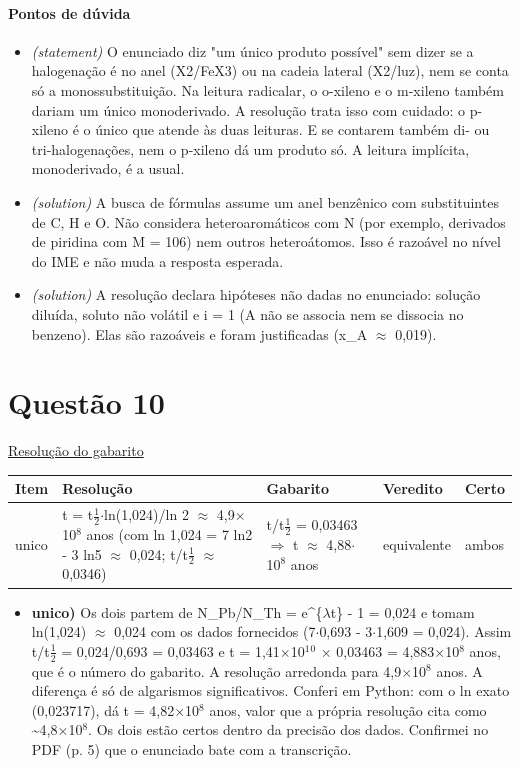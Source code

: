 \documentclass{article}%
\begin{document}
\paragraph{Pontos de dúvida}%
\begin{itemize}%
\item%
\textit{(statement)} O enunciado diz "um único produto possível" sem dizer se a halogenação é no anel (X2/FeX3) ou na cadeia lateral (X2/luz), nem se conta só a monossubstituição. Na leitura radicalar, o o{-}xileno e o m{-}xileno também dariam um único monoderivado. A resolução trata isso com cuidado: o p{-}xileno é o único que atende às duas leituras. E se contarem também di{-} ou tri{-}halogenações, nem o p{-}xileno dá um produto só. A leitura implícita, monoderivado, é a usual.%
\item%
\textit{(solution)} A busca de fórmulas assume um anel benzênico com substituintes de C, H e O. Não considera heteroaromáticos com N (por exemplo, derivados de piridina com M = 106) nem outros heteroátomos. Isso é razoável no nível do IME e não muda a resposta esperada.%
\item%
\textit{(solution)} A resolução declara hipóteses não dadas no enunciado: solução diluída, soluto não volátil e i = 1 (A não se associa nem se dissocia no benzeno). Elas são razoáveis e foram justificadas (x\_A $\approx$ 0,019).%
\end{itemize}%
\section*{Questão 10}%
\href{https://poliedroresolve.sistemapoliedro.com.br/vestibulares/ime/2027/ime-2-fase-dia-3-28-10-2026-2-fase-dia-3/dissertativa-10-quimica-2-fase-dia-3-ime-2027}{Resolução do gabarito}\par\smallskip%
\begin{longtable}{@{}p{} p{} p{} p{} p{}@{}}\toprule Item & Resolução & Gabarito & Veredito & Certo \\ \midrule
unico & t = t$\frac12$$\cdot$ln(1,024)/ln 2 $\approx$ 4,9$\times$10$^{8}$ anos (com ln 1,024 = 7 ln2 - 3 ln5 $\approx$ 0,024; t/t$\frac12$ $\approx$ 0,0346) & t/t$\frac12$ = 0,03463 $\Rightarrow$ t $\approx$ 4,88$\cdot$10$^{8}$ anos & equivalente & ambos \\
\bottomrule\end{longtable}%
\begin{itemize}%
\item%
\textbf{unico)} Os dois partem de N\_Pb/N\_Th = e\^{}\{$\lambda$t\} - 1 = 0,024 e tomam ln(1,024) $\approx$ 0,024 com os dados fornecidos (7$\cdot$0,693 - 3$\cdot$1,609 = 0,024). Assim t/t$\frac12$ = 0,024/0,693 = 0,03463 e t = 1,41$\times$10$^{1}$$^{0}$ $\times$ 0,03463 = 4,883$\times$10$^{8}$ anos, que é o número do gabarito. A resolução arredonda para 4,9$\times$10$^{8}$ anos. A diferença é só de algarismos significativos. Conferi em Python: com o ln exato (0,023717), dá t = 4,82$\times$10$^{8}$ anos, valor que a própria resolução cita como \textasciitilde{}4,8$\times$10$^{8}$. Os dois estão certos dentro da precisão dos dados. Confirmei no PDF (p. 5) que o enunciado bate com a transcrição.%
\end{itemize}%
\end{document}
